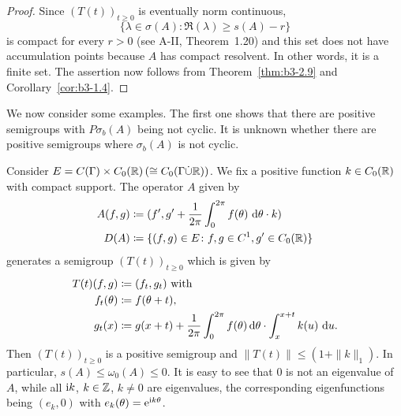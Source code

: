 \begin{proof}
	Since $(T(t))_{t \geq 0}$ is eventually norm continuous, 
    \[
    \{\lambda \in \sigma(A) \colon \Re(\lambda) \geq s(A)-r\}
    \]
    is compact for every $r > 0$ (see A-II, Theorem~1.20) and this set does not have accumulation points because $A$ has compact resolvent.
	In other words, it is a finite set.
	The assertion now follows from Theorem~\ref{thm:b3-2.9} and Corollary~\ref{cor:b3-1.4}.
\end{proof}
We now consider some examples. 
The first one shows that there are positive semigroups with $P\sigma_{b}(A)$ being not cyclic.
It is unknown whether there are positive semigroups where $\sigma_{b}(A)$ is not cyclic.
\begin{example}\label{ex:b3-2.13}
%
	Consider $E = C(\Gamma) \times C_{0}(\mathbb{R}) \, (\cong C_{0}(\Gamma\dot{\cup}\mathbb{R}))$.
	We fix a positive function $k \in C_{0}(\mathbb{R})$ with compact support.
	The operator $A$ given by
	\begin{equation}\label{eq:b3-2.20}
		\begin{aligned}
		A(f,g) &\coloneqq (f',g' + \frac{1}{2\pi}\int_{0}^{2\pi} f(\theta) \, \mathop{}\!\mathrm{d}{\theta}\cdot k) \\
		D(A) &\coloneqq \{(f,g) \in E \colon f,g \in C^{1}, g' \in C_{0}(\mathbb{R})\}
		\end{aligned}
	\end{equation}
	generates a semigroup $(T(t))_{t \geq 0}$ which is given by
	\begin{equation}\label{eq:b3-2.21}
		\begin{aligned}
			T(t)(f,g) &\coloneq (f_{t},g_{t}) \text{ with }\\
		   f_{t}(\theta) &\coloneqq f(\theta+t), \\
			g_{t}(x) &\coloneqq g(x+t) + \frac{1}{2\pi}\int_{0}^{2\pi} f(\theta) \mathop{}\!\mathrm{d}{\theta}\cdot\int_{x}^{x+t} k(u) \, \mathop{}\!\mathrm{d}{u} .
		\end{aligned} 
	\end{equation}
	Then $(T(t))_{t \geq 0}$ is a positive semigroup and $\|T(t)\| \leq (1 + \|k\|_{1})$.
	In particular, $s(A) \leq \omega_{0}(A) \leq 0$.
	It is easy to see that $0$ is not an eigenvalue of $A$, while all $\mathrm{i} k$, $k \in \mathbb{Z}$, $k \neq 0$ are eigenvalues, the corresponding eigenfunctions being $(e_{k},0)$ with $e_{k}(\theta) = \mathrm{e}^{\mathrm{i} k\theta}$.
\end{example}
